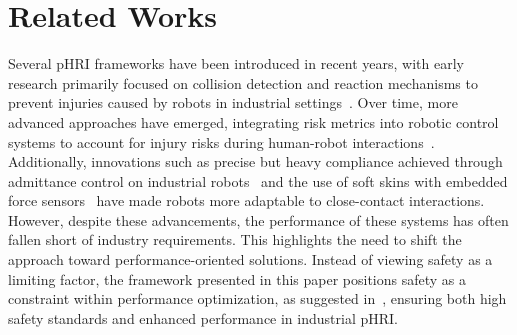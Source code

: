 \section{Related Works}
\label{sec:relatedworks}

Several pHRI frameworks have been introduced in recent years, with early research primarily focused on collision detection and reaction mechanisms to prevent injuries caused by robots in industrial settings~\cite{4650764}. Over time, more advanced approaches have emerged, integrating risk metrics into robotic control systems to account for injury risks during human-robot interactions~\cite{phrihaddadin}. Additionally, innovations such as precise but heavy compliance achieved through admittance control on industrial robots~\cite{8793657} and the use of soft skins with embedded force sensors~\cite{yan2024soft} have made robots more adaptable to close-contact interactions. However, despite these advancements, the performance of these systems has often fallen short of industry requirements. This highlights the need to shift the approach toward performance-oriented solutions. Instead of viewing safety as a limiting factor, the framework presented in this paper positions safety as a constraint within performance optimization, as suggested in~\cite{VILLANI2018248}, ensuring both high safety standards and enhanced performance in industrial pHRI.